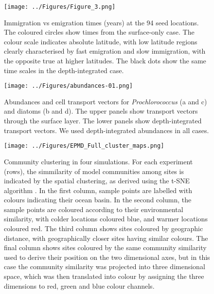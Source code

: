 \documentclass[12pt]{article}
\begin{document}
\begin{figure*}[t!]
    \centering
        \texttt{[image: ../Figures/Figure\_3.png]}
    \caption{Immigration vs emigration times (years) at the 94 seed locations. The coloured circles show times from the surface-only case. The colour scale indicates absolute latitude, with low latitude regions clearly characterised by fast emigration and slow immigration, with the opposite true at higher latitudes. The black dots show the same time scales in the depth-integrated case.}
\label{Imm_vs_em}
\end{figure*}

\begin{figure*}[htp!]
    \centering
        \texttt{[image: ../Figures/abundances-01.png]}
\caption{Abundances and cell transport vectors for \textit{Prochlorococcus} (a and c) and diatoms (b and d). The upper panels show transport vectors through the surface layer. The lower panels show depth-integrated transport vectors. We used depth-integrated abundances in all cases.}
\label{Abundances}
\end{figure*}

\begin{figure}[htp!]
\texttt{[image: ../Figures/EPMD\_Full\_cluster\_maps.png]}
\caption{Community clustering in four simulations. For each experiment (rows), the simmilarity of model communities among sites is indicated by the spatial clustering, as derived using the t-SNE algorithm \citep{VanDerMaaten:2014}. In the first column, sample points are labelled with colours indicating their ocean basin. In the second column, the sample points are coloured according to their environmental similarity, with colder locations coloured blue, and warmer locations coloured red. The third column shows sites coloured by geographic distance, with geographically closer sites having similar colours. The final column shows sites coloured by the same community similarity used to derive their position on the two dimensional axes, but in this case the community similarity was projected into three dimensional space, which was then translated into colour by assigning the three dimensions to red, green and blue colour channels.}
\label{Schematic}
\end{figure}
\end{document}
